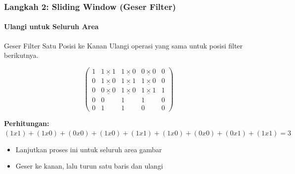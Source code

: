 \documentclass[t,aspectratio=169,xcolor=dvipsnames]{beamer}
\begin{document}
\begin{frame}
    \frametitle{Langkah 2: Sliding Window (Geser Filter)}
    \framesubtitle{Ulangi untuk Seluruh Area}
    \footnotesize

    \begin{block}{Geser Filter Satu Posisi ke Kanan}
        Ulangi operasi yang sama untuk posisi filter berikutnya.
    \end{block}

    $$
    \begin{pmatrix}
    1 & \underline{1 \times 1} & \underline{1 \times 0} & \underline{0 \times 0} & 0 \\
    0 & \underline{1 \times 0} & \underline{1 \times 1} & \underline{1 \times 0} & 0 \\
    0 & \underline{0 \times 0} & \underline{1 \times 0} & \underline{1 \times 1} & 1 \\
    0 & 0 & 1 & 1 & 0 \\
    0 & 1 & 1 & 0 & 0
    \end{pmatrix}
    $$

    \textbf{Perhitungan:} $(1x1) + (1x0) + (0x0) + (1x0) + (1x1) + (1x0) + (0x0) + (0x1) + (1x1) = 3$

    \begin{itemize}
        \item Lanjutkan proses ini untuk seluruh area gambar
        \item Geser ke kanan, lalu turun satu baris dan ulangi
    \end{itemize}

\end{frame}
\end{document}
